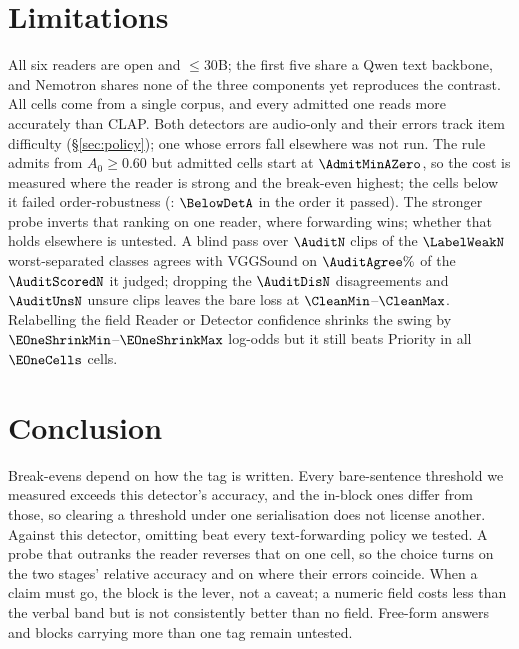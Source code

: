 \section{Limitations}
\label{sec:limits}

All six readers are open and ${\le}30$B; the first five share a Qwen text backbone, and Nemotron shares none of the three components yet reproduces the contrast. All cells come from a single corpus, and every admitted one reads more accurately than CLAP. Both detectors are audio-only and their errors track item difficulty (\S\ref{sec:policy}); one whose errors fall elsewhere was not run. The rule admits from $A_0\ge0.60$ but
admitted cells start at $\AdmitMinAZero$, so the cost is measured where the reader is strong and the
break-even highest; the cells below it failed order-robustness
(\BelowDetCell{}: $\BelowDetA$ in the order it passed). The stronger probe
inverts that ranking on one reader, where forwarding wins; whether that holds elsewhere is
untested.  A blind pass over $\AuditN$ clips of the $\LabelWeakN$ worst-separated classes agrees with VGG\-Sound on
$\AuditAgree\%$ of the $\AuditScoredN$ it judged; dropping the $\AuditDisN$ disagreements and
$\AuditUnsN$ unsure clips leaves the bare loss at $\CleanMin$--$\CleanMax$. Relabelling the field Reader or Detector confidence shrinks the swing by
$\EOneShrinkMin$--$\EOneShrinkMax$ log-odds but it still beats Priority in all $\EOneCells$ cells.

\section{Conclusion}
Break-evens depend on how the tag is written. Every
bare-sentence threshold we measured exceeds this detector's accuracy, and the in-block ones differ from those, so
clearing a threshold under one serialisation does not license another. Against this detector,
omitting beat every text-forwarding policy we tested. A probe that outranks the reader reverses that
on one cell, so the choice turns on the two stages' relative accuracy and on where their errors
coincide. When a claim must go, the block is the lever, not a caveat; a numeric
field costs less than the verbal band but is not consistently better than no field. Free-form answers and blocks carrying more than one tag remain untested.

\clearpage


